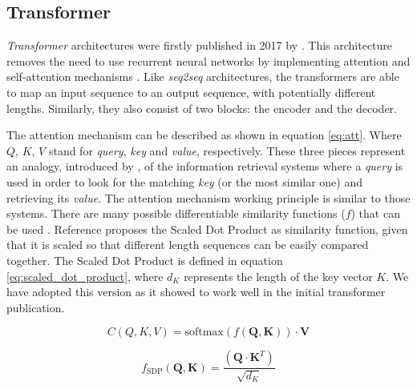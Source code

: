 \documentclass{elsarticle}
\begin{document}
   
	
	\subsection{Transformer}
	\textit{Transformer} architectures were firstly published  in 2017 by \cite{vaswani2017}. This architecture removes the need to use recurrent neural networks by implementing attention and self-attention mechanisms \cite{bahdanau2015}.  Like \textit{seq2seq} architectures, the transformers are able to map an input sequence to an output sequence, with potentially different lengths. Similarly, they also consist of two blocks: the encoder and the decoder.
	
	The attention mechanism can be described as shown in equation \ref{eq:att}. Where $Q$, $K$, $V$ stand for \textit{query}, \textit{key} and \textit{value}, respectively. These three pieces represent an analogy, introduced by \cite{vaswani2017}, of the information retrieval systems where a \textit{query} is used in order to look for the matching \textit{key} (or the most similar one) and retrieving its \textit{value}. The attention mechanism working principle is similar to those systems. There are many possible differentiable similarity functions ($f$) that can be used \cite{kamath2019}. Reference \cite{vaswani2017} proposes the Scaled Dot Product as similarity function, given that it is scaled so that different length sequences can be easily compared together. The Scaled Dot Product is defined in equation \ref{eq:scaled_dot_product},  where $d_K$ represents the length of the key vector $K$. We have adopted this version as it showed to work well in the initial transformer publication.
	
	\begin{equation}
	C(Q,K,V) = \text{softmax}(f(\mathbf{Q}, \mathbf{K})) \cdot \mathbf{V}
	\label{eq:att}
	\end{equation}
	
	\begin{equation}
	f_{\text{SDP}}(\mathbf{Q}, \mathbf{K}) = \frac{(\mathbf{Q} \cdot \mathbf{K}^T)} {\sqrt {d_K}}
	\label{eq:scaled_dot_product}
	\end{equation}
	
\end{document}
